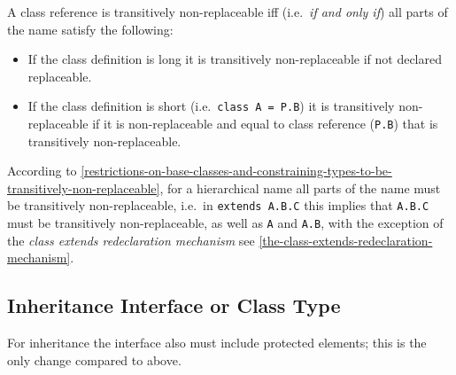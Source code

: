 A class reference is transitively non-replaceable iff (i.e.\ \emph{if and
only if}) all parts of the name satisfy the following:
\begin{itemize}
\item
  If the class definition is long it is transitively non-replaceable if
  not declared replaceable.
\item
  If the class definition is short (i.e.\ \lstinline!class A = P.B!) it is
  transitively non-replaceable if it is non-replaceable and equal to
  class reference (\lstinline!P.B!) that is transitively non-replaceable.
\end{itemize}

\begin{nonnormative}
According to \cref{restrictions-on-base-classes-and-constraining-types-to-be-transitively-non-replaceable}, for a hierarchical name all
parts of the name must be transitively non-replaceable, i.e.\ in \lstinline!extends A.B.C! this implies that \lstinline!A.B.C! must be transitively
non-replaceable, as well as \lstinline!A! and \lstinline!A.B!, with the exception of the \emph{class
extends redeclaration mechanism} see \cref{the-class-extends-redeclaration-mechanism}.
\end{nonnormative}

\subsection{Inheritance Interface or Class Type}\label{inheritance-interface-or-class-type}

For inheritance the interface also must include protected elements; this
is the only change compared to above.

